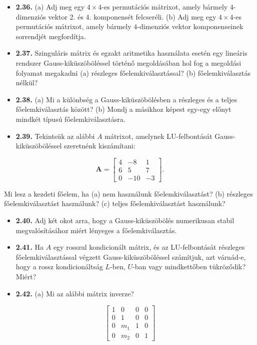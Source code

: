 \documentclass[
  magyar,
  11pt]{article}
\providecommand{\tightlist}{%
  \setlength{\itemsep}{0pt}\setlength{\parskip}{0pt}}
\providecommand{\boldsymbol}[1]{\mathbf{#1}}
\begin{document}
\begin{itemize}
\tightlist
\item
  \textbf{2.36.} (a) Adj meg egy \(4 \times 4\)-es permutációs mátrixot,
  amely bármely \(4\)-dimenziós vektor 2. és 4. komponensét felcseréli.
  (b) Adj meg egy \(4 \times 4\)-es permutációs mátrixot, amely bármely
  \(4\)-dimenziós vektor komponenseinek sorrendjét megfordítja.
\item
  \textbf{2.37.} Szinguláris mátrix és egzakt aritmetika használata
  esetén egy lineáris rendszer Gauss-kiküszöböléssel történő
  megoldásában hol fog a megoldási folyamat megakadni (a) részleges
  főelemkiválasztással? (b) főelemkiválasztás nélkül?
\item
  \textbf{2.38.} (a) Mi a különbség a Gauss-kiküszöbölésben a részleges
  és a teljes főelemkiválasztás között? (b) Mondj a másikhoz képest
  egy-egy előnyt mindkét típusú főelemkiválasztásra.
\item
  \textbf{2.39.} Tekintsük az alábbi \(A\) mátrixot, amelynek
  LU-felbontását Gauss-kiküszöböléssel szeretnénk kiszámítani:
\end{itemize}

\[\boldsymbol{A} = \begin{bmatrix} 4 & -8 & 1 \\ 6 & 5 & 7 \\ 0 & -10 & -3 \end{bmatrix}.\]

Mi lesz a kezdeti főelem, ha (a) nem használunk főelemkiválasztást? (b)
részleges főelemkiválasztást használunk? (c) teljes főelemkiválasztást
használunk?

\begin{itemize}
\tightlist
\item
  \textbf{2.40.} Adj két okot arra, hogy a Gauss-kiküszöbölés
  numerikusan stabil megvalósításához miért lényeges a
  főelemkiválasztás.
\item
  \textbf{2.41.} Ha \(A\) egy rosszul kondicionált mátrix, és az
  LU-felbontását részleges főelemkiválasztással végzett
  Gauss-kiküszöböléssel számítjuk, azt várnád-e, hogy a rossz
  kondicionáltság \(L\)-ben, \(U\)-ban vagy mindkettőben tükröződik?
  Miért?
\item
  \textbf{2.42.} (a) Mi az alábbi mátrix inverze?
\end{itemize}

\[\begin{bmatrix} 1 & 0 & 0 & 0 \\ 0 & 1 & 0 & 0 \\ 0 & m_1 & 1 & 0 \\ 0 & m_2 & 0 & 1 \end{bmatrix}\]
\end{document}
